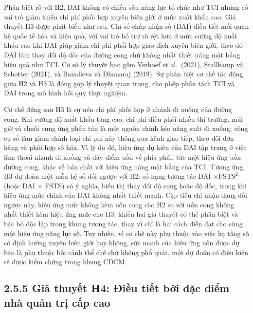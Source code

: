 \documentclass[
  a4paper,
  13pt]{extreport}
\begin{document}
Phân biệt rõ với H2, DAI không có chiều sâu năng lực tổ chức như TCI
nhưng có vai trò giảm thiểu chi phí phối hợp xuyên biên giới ở mức xuất
khẩu cao. Giả thuyết H3 được phát biểu như sau. Chỉ số chấp nhận số
(DAI) điều tiết mối quan hệ quốc tế hóa và hiệu quả, với vai trò bổ trợ
rõ rệt hơn ở mức cường độ xuất khẩu cao khi DAI giúp giảm chi phí phối
hợp giao dịch xuyên biên giới, theo đó DAI làm thay đổi độ dốc của đường
cong chứ không nhất thiết nâng mặt bằng hiệu quả như TCI. Cơ sở lý
thuyết bao gồm Verhoef et al.~(2021), Stallkamp và Schotter (2021), và
Banalieva và Dhanaraj (2019). Sự phân biệt cơ chế tác động giữa H2 và H3
là đóng góp lý thuyết quan trọng, cho phép phân tách TCI và DAI trong mô
hình hồi quy thực nghiệm.

Cơ chế đứng sau H3 là sự nén chi phí phối hợp ở nhánh đi xuống của đường
cong. Khi cường độ xuất khẩu tăng cao, chi phí điều phối nhiều thị
trường, múi giờ và chuỗi cung ứng phân tán là một nguồn chính kéo năng
suất đi xuống; công cụ số làm giảm chính loại chi phí này thông qua kênh
giao tiếp, theo dõi đơn hàng và phối hợp số hóa. Vì lý do đó, hiệu ứng
dự kiến của DAI tập trung ở việc làm thoải nhánh đi xuống và đẩy điểm
uốn về phía phải, tức một hiệu ứng uốn đường cong, khác về bản chất với
hiệu ứng nâng mặt bằng của TCI. Tương ứng, H3 dự đoán một mẫu hệ số đối
ngược với H2: số hạng tương tác DAI \(\times \text{FSTS}^2\) (hoặc DAI ×
FSTS) có ý nghĩa, biểu thị thay đổi độ cong hoặc độ dốc, trong khi hiệu
ứng mức chính của DAI không nhất thiết mạnh. Cặp tiêu chí nhận dạng đối
ngược này, hiệu ứng mức không kèm uốn cong cho H2 so với uốn cong không
nhất thiết kèm hiệu ứng mức cho H3, khiến hai giả thuyết có thể phân
biệt và bác bỏ độc lập trong khung tương tác, thay vì chỉ là hai cách
diễn đạt cho cùng một hiệu ứng năng lực số. Tuy nhiên, vì cơ chế này phụ
thuộc vào việc hạ tầng số có định hướng xuyên biên giới hay không, sức
mạnh của hiệu ứng uốn được dự báo là phụ thuộc bối cảnh thể chế chứ
không phổ quát, một dự đoán có điều kiện sẽ được kiểm chứng trong khung
CDCM.

\hypertarget{giux1ea3-thuyux1ebft-h4-ux111iux1ec1u-tiux1ebft-bux1edfi-ux111ux1eb7c-ux111iux1ec3m-nhuxe0-quux1ea3n-trux1ecb-cux1ea5p-cao}{%
\subsection{2.5.5 Giả thuyết H4: Điều tiết bởi đặc điểm nhà quản trị cấp
cao}\label{giux1ea3-thuyux1ebft-h4-ux111iux1ec1u-tiux1ebft-bux1edfi-ux111ux1eb7c-ux111iux1ec3m-nhuxe0-quux1ea3n-trux1ecb-cux1ea5p-cao}}
\end{document}
